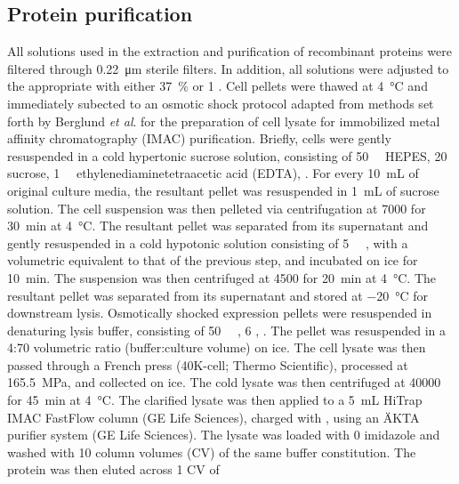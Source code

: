 \begin{refsection}
\subsection{Protein purification}

All solutions used in the extraction and purification of recombinant proteins
were filtered through \SI{0.22}{\um} sterile filters. In addition, all solutions
were adjusted to the appropriate \pH with either \SI{37}{\percent}  or
\SI{1}{\moLar} . Cell pellets were thawed at \SI{4}{\celsius} and
immediately subected to an osmotic shock protocol adapted from methods set forth
by Berglund \emph{et al}.  for the preparation of cell lysate for immobilized
metal affinity chromatography (IMAC)
purification.\cite{Neu1965,Bae2000,Magnusdottir2009} Briefly, cells were gently
resuspended in a cold hypertonic sucrose solution, consisting of
\SI{50}{\milli\moLar} HEPES, \SI{20}{\wtper} sucrose, \SI{1}{\milli\moLar}
ethylenediaminetetraacetic acid (EDTA), . For every \SI{10}{\mL} of
original culture media, the resultant pellet was resuspended in \SI{1}{\mL} of
sucrose solution. The cell suspension was then pelleted via centrifugation at
\SI{7000}{\gforce} for \SI{30}{\minute} at \SI{4}{\celsius}. The resultant
pellet was separated from its supernatant and gently resuspended in a cold
hypotonic solution consisting of \SI{5}{\milli\moLar} , with a
volumetric equivalent to that of the previous step, and incubated on ice for
\SI{10}{\minute}. The suspension was then centrifuged at \SI{4500}{\gforce} for
\SI{20}{\minute} at \SI{4}{\celsius}. The resultant pellet was separated from
its supernatant and stored at \SI{-20}{\celsius} for downstream lysis. 
Osmotically shocked expression pellets were resuspended in denaturing lysis
buffer, consisting of \SI{50}{\milli\moLar} , \SI{6}{\moLar}
, . The pellet was resuspended in a 4:70 volumetric ratio
(buffer:culture volume) on ice. The cell lysate was then passed through a French
press (40K-cell; Thermo Scientific), processed at \SI{165.5}{\MPa}, and
collected on ice. The cold lysate was then centrifuged at \SI{40000}{\gforce}
for \SI{45}{\minute} at \SI{4}{\celsius}. The clarified lysate was then applied
to a \SI{5}{\mL} HiTrap IMAC FastFlow column (GE Life Sciences), charged with
, using an \"{A}KTA purifier system (GE Life Sciences). The lysate was
loaded with \SI{0}{\moLar} imidazole and washed with 10 column volumes (CV) of
the same buffer constitution. The protein was then eluted across 1 CV of

\end{refsection}

